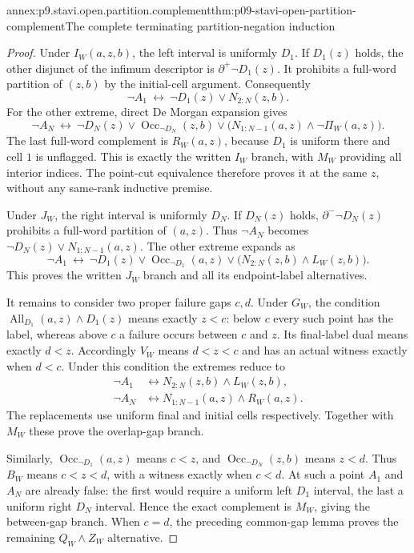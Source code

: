 \begin{annexitem}{annex:p9.stavi.open.partition.complement}{thm:p09-stavi-open-partition-complement}{The complete terminating partition-negation induction}
\begin{proof}
Under \(I_W(a,z,b)\), the
left interval is uniformly
\(D_1\). If \(D_1(z)\)
holds, the other disjunct
of the infimum descriptor
is \(\partial^+\neg D_1(z)\).
It prohibits a full-word
partition of \((z,b)\)
by the initial-cell argument.
Consequently
\[
       \neg A_1\ \longleftrightarrow\
                     \neg D_1(z)\lor N_{2:N}(z,b).
\]
For the other extreme, direct
De Morgan expansion gives
\[
 \neg A_N\ \longleftrightarrow\
 \neg D_N(z)\lor\operatorname{Occ}_{\neg D_N}(z,b)
 \lor\bigl(N_{1:N-1}(a,z)\land\neg\Pi_W(a,z)\bigr).
\]
The last full-word complement
is \(R_W(a,z)\), because
\(D_1\) is uniform there
and cell \(1\) is unflagged.
This is exactly the written
\(I_W\) branch, with \(M_W\)
providing all interior indices.
The point-cut equivalence
therefore proves it at the
same \(z\), without any
same-rank inductive premise.

Under \(J_W\), the right
interval is uniformly \(D_N\).
If \(D_N(z)\) holds,
\(\partial^-\neg D_N(z)\)
prohibits a full-word
partition of \((a,z)\).
Thus \(\neg A_N\) becomes
\(\neg D_N(z)\lor N_{1:N-1}(a,z)\).
The other extreme expands as
\[
 \neg A_1\ \longleftrightarrow\
 \neg D_1(z)\lor\operatorname{Occ}_{\neg D_1}(a,z)
 \lor\bigl(N_{2:N}(z,b)\land L_W(z,b)\bigr).
\]
This proves the written
\(J_W\) branch and all its
endpoint-label alternatives.

It remains to consider two
proper failure gaps \(c,d\).
Under \(G_W\), the condition
\(\operatorname{All}_{D_1}(a,z)\land D_1(z)\)
means exactly \(z<c\): below
\(c\) every such point has
the label, whereas above
\(c\) a failure occurs
between \(c\) and \(z\).
Its final-label dual means
exactly \(d<z\). Accordingly
\(V_W\) means \(d<z<c\)
and has an actual witness
exactly when \(d<c\).
Under this condition the
extremes reduce to
\[
\begin{aligned}
 \neg A_1&\longleftrightarrow
                   N_{2:N}(z,b)\land L_W(z,b),\\
 \neg A_N&\longleftrightarrow
                   N_{1:N-1}(a,z)\land R_W(a,z).
\end{aligned}
\]
The replacements use uniform
final and initial cells
respectively. Together with
\(M_W\) these prove the
overlap-gap branch.

Similarly,
\(\operatorname{Occ}_{\neg D_1}(a,z)\)
means \(c<z\), and
\(\operatorname{Occ}_{\neg D_N}(z,b)\)
means \(z<d\). Thus \(B_W\)
means \(c<z<d\), with
a witness exactly when
\(c<d\). At such a point
\(A_1\) and \(A_N\) are
already false: the first
would require a uniform
left \(D_1\) interval,
the last a uniform right
\(D_N\) interval. Hence
the exact complement is
\(M_W\), giving the
between-gap branch.
When \(c=d\), the preceding
common-gap lemma proves
the remaining \(Q_W\land Z_W\)
alternative.


\end{proof}
\end{annexitem}
